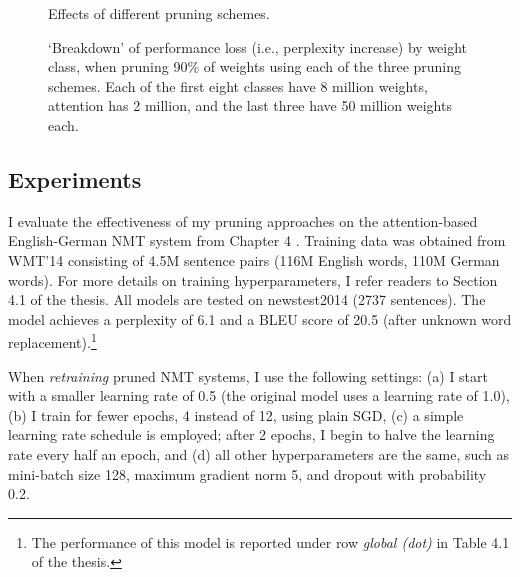 \begin{figure}
\centering

\caption{Effects of different pruning schemes.}
\label{fig:pruning_methods}
\end{figure}

\begin{figure}
\centering

\caption[`Breakdown' of performance loss]{`Breakdown' of performance loss (i.e., perplexity increase) by weight class, when pruning 90\% of weights using each of the three pruning schemes. Each of the first eight classes have 8 million weights, attention has 2 million, and the last three have 50 million weights each.}
\label{fig:breakdown}
\end{figure}

\subsection{Experiments}
\label{subsec:exp}
I evaluate the effectiveness of my pruning approaches on the attention-based English-German NMT system 
from Chapter 4 \cite{luong15attn}. 
Training data was obtained from WMT'14 consisting
of 4.5M sentence pairs (116M English words, 110M German words). For
more details on training hyperparameters, I refer readers to Section 4.1 of
the thesis.
All models are tested on newstest2014 (2737 sentences). 
The model achieves a
perplexity of 6.1 and a BLEU score of
20.5 (after unknown word replacement).\footnote{The performance of this model
is reported under row {\it global (dot)} in Table 4.1 of the thesis.}

When {\it retraining} pruned NMT systems, I use the following settings: (a) I start
with a smaller learning rate of 0.5 (the original model uses a learning rate of
1.0), (b) I train for fewer epochs, 4 instead of 12, using plain SGD, (c) a simple learning
rate schedule is employed; after 2 epochs, I begin to halve the learning rate
every half an epoch, and (d) all other hyperparameters are the same, such as
mini-batch size 128, maximum gradient norm 5, and dropout with probability 0.2.

